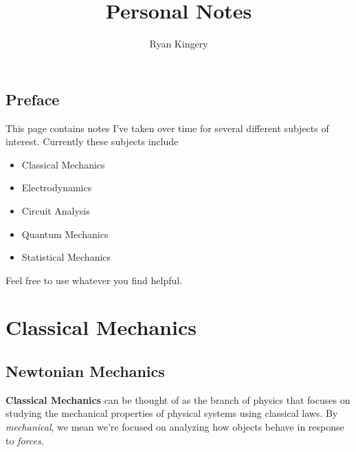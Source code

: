 \documentclass[
  letterpaper,
  DIV=11,
  numbers=noendperiod]{scrreprt}
\title{Personal Notes}
\author{Ryan Kingery}
\date{}
\providecommand{\tightlist}{%
  \setlength{\itemsep}{0pt}\setlength{\parskip}{0pt}}\usepackage{longtable,booktabs,array}
\renewcommand*\contentsname{Table of contents}
\newcommand\contentsname{Table of contents}
\begin{document}
\maketitle
\ifdefined\Shaded\renewenvironment{Shaded}{\begin{tcolorbox}[enhanced, borderline west={3pt}{0pt}{shadecolor}, breakable, sharp corners, interior hidden, boxrule=0pt, frame hidden]}{\end{tcolorbox}}\fi

\renewcommand*\contentsname{Table of contents}
{
\hypersetup{linkcolor=}
\setcounter{tocdepth}{2}
\tableofcontents
}

\hypertarget{preface}{%
\chapter*{Preface}\label{preface}}


This page contains notes I've taken over time for several different
subjects of interest. Currently these subjects include

\begin{itemize}
\tightlist
\item
  Classical Mechanics
\item
  Electrodynamics
\item
  Circuit Analysis
\item
  Quantum Mechanics
\item
  Statistical Mechanics
\end{itemize}

Feel free to use whatever you find helpful.

\part{Classical Mechanics}

\hypertarget{newtonian-mechanics}{%
\chapter{Newtonian Mechanics}\label{newtonian-mechanics}}

\textbf{Classical Mechanics} can be thought of as the branch of physics
that focuses on studying the mechanical properties of physical systems
using classical laws. By \emph{mechanical}, we mean we're focused on
analyzing how objects behave in response to \emph{forces}.
\end{document}
